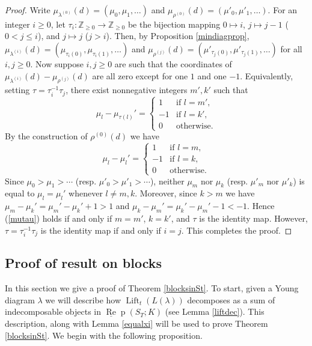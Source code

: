 \documentclass{amsart}
\theoremstyle{definition}
\def\uRep{\underline{\operatorname{Re}}\!\operatorname{p}}
\newcommand{\Lift}{\operatorname{Lift}}
\renewcommand{\1}{_{(1)}}
\renewcommand{\2}{_{(2)}}
\newcommand{\3}{_{(3)}}
\newcommand{\4}{_{(4)}}
\newcommand{\Z}{\mathbb{Z}}
\begin{document}
\begin{proof}
Write $\mu_{\lambda^{(0)}}(d)=(\mu_0, \mu_1,\ldots)$ and $\mu_{\rho^{(0)}}(d)=(\mu'_0, \mu'_1,\ldots)$.  For an integer $i\geq0$, let $\tau_i:\Z_{\geq 0}\to\Z_{\geq 0}$ be the bijection mapping $0\mapsto i$, $j\mapsto j-1$ ($0<j\leq i$), and $j\mapsto j$ ($j>i$).  Then, by Proposition \ref{mindiagprop}, $\mu_{\lambda^{(i)}}(d)=(\mu_{\tau_i(0)}, \mu_{\tau_i(1)},\ldots)$ and $\mu_{\rho^{(j)}}(d)=(\mu'_{\tau_j(0)}, \mu'_{\tau_j(1)},\ldots)$ for all $i, j\geq 0$.  
Now suppose $i, j\geq 0$ are such that the coordinates of $\mu_{\lambda^{(i)}}(d)-\mu_{\rho^{(j)}}(d)$ are all zero except for one $1$ and one $-1$.  Equivalently, setting $\tau=\tau_i^{-1}\tau_j$, there exist nonnegative integers $m', k'$ such that \begin{equation}\label{mutau}\mu_l-\mu_{\tau(l)}'=\left\{\begin{array}{ll}
1 & \text{if $l=m'$,}\\
-1& \text{if $l=k'$,}\\
0 & \text{otherwise.}
\end{array}\right.\end{equation}  
By the construction of $\rho^{(0)}(d)$ we have $$\mu_l-\mu_l'=\left\{\begin{array}{ll}
1 & \text{if $l=m$,}\\
-1& \text{if $l=k$,}\\
0 & \text{otherwise.}
\end{array}\right.$$
Since $\mu_0>\mu_1>\cdots$ (resp. $\mu'_0>\mu'_1>\cdots$), neither $\mu_m$ nor $\mu_k$ (resp. $\mu'_m$ nor $\mu'_k$) is equal to $\mu_l=\mu_l'$ whenever $l\not=m, k$.  Moreover, since $k>m$ we have $\mu_m-\mu_k'=\mu_m'-\mu_k'+1>1$ and $\mu_k-\mu_m'=\mu_k'-\mu_m'-1<-1$.  Hence (\ref{mutau}) holds if and only if $m=m'$, $k=k'$, and $\tau$ is the identity map.  However, $\tau=\tau_i^{-1}\tau_j$ is the identity map if and only if $i=j$.  This completes the proof.
\end{proof}











\subsection{Proof of result on blocks}\label{secblocks} In this section we give a proof of Theorem \ref{blocksinSt}.  To start, given a Young diagram $\lambda$ we will describe how $\Lift_t(L(\lambda))$ decomposes as a sum of indecomposable objects in $\uRep(S_T; K)$ (see Lemma \ref{liftdec}).  This description, along with Lemma \ref{equalxi}  will be used to prove Theorem \ref{blocksinSt}.  We begin with the following proposition.
\end{document}
